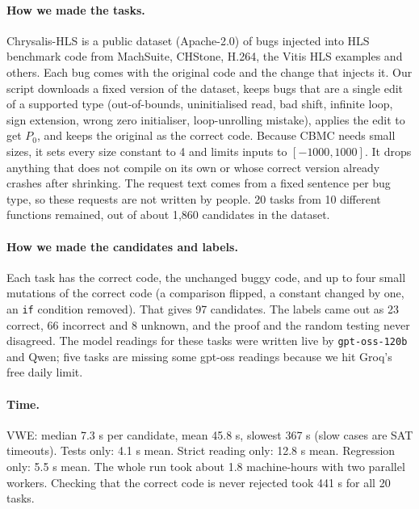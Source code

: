 \documentclass[10pt,a4paper]{article}
\newcommand{\Pz}{P_0}\newcommand{\Po}{P_1}
\begin{document}
\paragraph{How we made the tasks.} Chrysalis-HLS is a public dataset (Apache-2.0) of bugs injected
into HLS benchmark code from MachSuite, CHStone, H.264, the Vitis HLS examples and others. Each bug
comes with the original code and the change that injects it. Our script downloads a fixed version
of the dataset, keeps bugs that are a single edit of a supported type (out-of-bounds, uninitialised
read, bad shift, infinite loop, sign extension, wrong zero initialiser, loop-unrolling mistake),
applies the edit to get $\Pz$, and keeps the original as the correct code. Because CBMC needs small
sizes, it sets every size constant to 4 and limits inputs to $[-1000,1000]$. It drops anything that
does not compile on its own or whose correct version already crashes after shrinking. The request
text comes from a fixed sentence per bug type, so these requests are not written by people. 20 tasks
from 10 different functions remained, out of about 1{,}860 candidates in the dataset.

\paragraph{How we made the candidates and labels.} Each task has the correct code, the unchanged
buggy code, and up to four small mutations of the correct code (a comparison flipped, a constant
changed by one, an \texttt{if} condition removed). That gives 97 candidates. The labels came out as
23 correct, 66 incorrect and 8 unknown, and the proof and the random testing never disagreed. The
model readings for these tasks were written live by \texttt{gpt-oss-120b} and Qwen; five tasks are
missing some gpt-oss readings because we hit Groq's free daily limit.

\paragraph{Time.} VWE: median 7.3 s per candidate, mean 45.8 s, slowest 367 s (slow cases are SAT
timeouts). Tests only: 4.1 s mean. Strict reading only: 12.8 s mean. Regression only: 5.5 s mean.
The whole run took about 1.8 machine-hours with two parallel workers. Checking that the correct
code is never rejected took 441 s for all 20 tasks.
\end{document}
